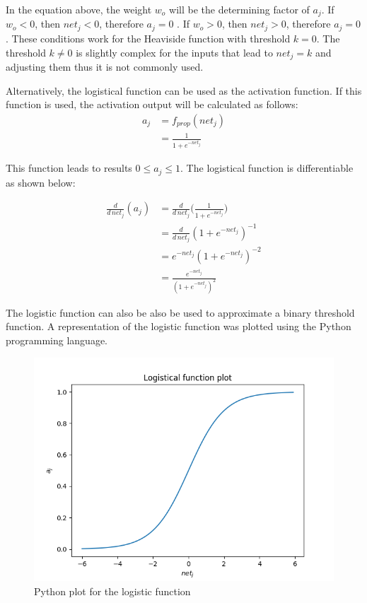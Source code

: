 In the equation above, the weight $w_o$ will be the determining factor of $a_j$. If $w_o < 0 $, then $net_j <0$, therefore $a_j  = 0$ . If $w_o >0$, then $net_j > 0$, therefore $a_j = 0$. These conditions work for the Heaviside function with threshold $k=0$. The threshold $k\neq 0 $ is slightly complex for the inputs that lead to $net_j = k$ and adjusting them thus it is not commonly used. 

Alternatively, the logistical function can be used as the activation function. If this function is used, the activation output will be calculated as follows:
\begin{align}
a_j&=f_{prop} (net_j)\\
&=\frac{1}{1+e^{-net_j}}	
\end{align}

This function leads to results $0 \leq a_j\leq 1$. The logistical function is differentiable as shown below:

\begin{align}
	\frac{d}{d\,net_j} (a_j )&=\frac{d}{d\, net_j} \big( \frac{1}{1+e^{-net_j}}\big) \nonumber \\	
	&=\frac {d}{d\,net_j} (1+e^{-net_j } )^{-1} \nonumber \\
	&=e^{-net_j} (1+e^{-net_j }  )^{-2} \nonumber \\
	&=\frac{e^{-net_j }}{(1+e^{-net_j } )^2} 
\end{align}

The logistic function can also be also be used to approximate a binary threshold function. A representation of the logistic function was plotted using the Python programming language.

\begin{figure}[h]
	\centering
	\includegraphics[scale=0.6]{10}
	\caption{Python plot for the logistic function}
\end{figure}

